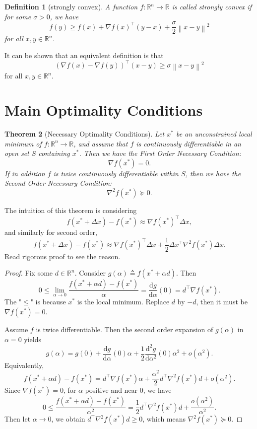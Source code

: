 \documentclass[12pt,a4paper]{article}
\numberwithin{equation}{section}
\theoremstyle{mystyle}
\newtheorem{definition}{Definition}[section]
\newtheorem{theorem}[definition]{Theorem}
\newcommand{\R}{\mathbb{R}}
\newcommand{\grad}{\nabla}
\renewcommand{\d}{\mathrm{d}}
\newcommand{\T}{\top}
\newcommand{\norm}[1]{\left\lVert #1 \right\rVert}
\begin{document}
	
	\begin{definition}[strongly convex]
		A function $f:\R^n \to \R$ is called \emph{strongly convex} if for some $\sigma>0$, we have
		\begin{equation}
			f(y)\geq f(x)+\grad f(x)^\T (y-x)+\frac{\sigma}{2}\norm{x-y}^2
		\end{equation}
		for all $x,y\in \R^n$.
	\end{definition}
	It can be shown that an equivalent definition is that
	\begin{equation}
		(\grad f(x)-\grad f(y))^\T(x-y)\geq \sigma \norm{x-y}^2
	\end{equation}
	for all $x,y\in \R^n$.
	
	

	\section{Main Optimality Conditions}
	\begin{theorem}[Necessary Optimality Conditions]
		Let $x^*$ be an unconstrained local minimum of $f:\R^n \to \R$, and assume that $f$ is continuously differentiable in an open set $S$ containing $x^*$. Then we have the \emph{First Order Necessary Condition}:
		\begin{equation}
			\grad f(x^*)=0.
		\end{equation}
		If in addition $f$ is twice continuously differentiable within $S$, then we have the \emph{Second Order Necessary Condition}:
		\begin{equation}
			\grad^2 f(x^*)\succeq 0.
		\end{equation}
	\end{theorem}
	The intuition of this theorem is considering
	$$
	f(x^*+\Delta x)-f(x^*)\approx \grad f(x^*)^\T \Delta x,
	$$
	and similarly for second order,
	$$
	f(x^*+\Delta x)-f(x^*)\approx \grad f(x^*)^\T \Delta x +\frac{1}{2}\Delta x^\T \grad^2 f(x^*)\Delta x.
	$$
	Read rigorous proof to see the reason.
	\begin{proof}
		Fix some $d\in \R^n$. Consider $g(\alpha)\triangleq f(x^*+\alpha d)$. Then
		$$
		0\leq 
		\lim_{\alpha\to 0}\frac{f(x^*+\alpha d)-f(x^*)}{\alpha} 
		= \frac{\d g}{\d \alpha}(0)=d^\T \grad f(x^*).
		$$
		The "$\leq$" is because $x^*$ is the local minimum. Replace $d$ by $-d$, then it must be $\grad f(x^*)=0$.
		
		Assume $f$ is twice differentiable. Then the second order expansion of $g(\alpha)$ in $\alpha=0$ yields
		$$
		g(\alpha) = g(0) + \frac{\d g}{\d \alpha}(0)\alpha +
		\frac{1}{2} \frac{\d^2 g}{\d \alpha^2}(0) \alpha^2 + o(\alpha^2).
		$$
		Equivalently,
		$$
		f(x^*+\alpha d) - f(x^*) = d^\T \grad f(x^*)\alpha + \frac{\alpha^2}{2} d^\T \grad^2 f(x^*) d + o(\alpha^2).
		$$
		Since $\grad f(x^*)=0$, for $\alpha$ positive and near 0, we have
		$$
		0\leq \frac{f(x^*+\alpha d)-f(x^*)}{\alpha^2}= 
		\frac{1}{2} d^\T \grad^2 f(x^*) d + \frac{o(\alpha^2)}{\alpha^2}.
		$$
		Then let $\alpha\to 0$, we obtain $d^\T \grad^2 f(x^*) d\geq 0$, which means $\grad^2 f(x^*) \succeq 0$.
	\end{proof}
	
\end{document}
